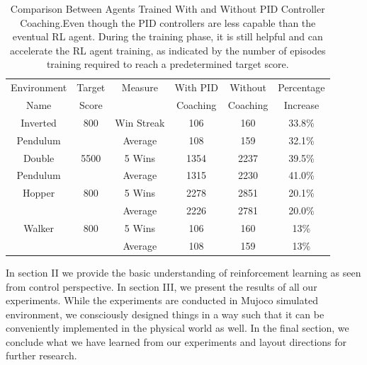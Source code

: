 \documentclass[journal]{IEEEtran}
\begin{document}
\begin{table}[H]
\scriptsize

\caption{Comparison Between Agents Trained With and Without PID Controller Coaching.Even though the PID controllers are less capable than the eventual RL agent. During the training phase, it is still helpful and can accelerate the RL agent training, as indicated by the number of episodes training required to reach a predetermined target score.}
\label{episode_compare}
\centering
\begin{tabular}{ cccccc }
\rowcolor{airforceblue}

Environment & Target & Measure  &  With PID  & Without  & Percentage\\
\rowcolor{airforceblue}

   Name     & Score  &              & Coaching  & Coaching  & Increase \\
\hline


Inverted & 800& Win Streak & 106 & 160&  33.8\% \\

Pendulum & &Average  & 108 &  159&  32.1\%\\
\rowcolor{beaublue}
Double & 5500& 5 Wins & 1354 & 2237&  39.5\%\\
\rowcolor{beaublue}
Pendulum & &Average & 1315 &  2230&  41.0\%\\
Hopper & 800& 5 Wins & 2278 & 2851&  20.1\%\\
       & &Average  & 2226 &  2781&  20.0\%\\
\rowcolor{beaublue}
Walker & 800& 5 Wins & 106 & 160&  13\%\\
\rowcolor{beaublue}
       & &Average  & 108 &  159&  13\%\\

\end{tabular}
\end{table}




In section II we provide the basic understanding of reinforcement learning as seen from control perspective. In section III, we present the results of all our experiments. While the experiments are conducted in Mujoco simulated environment, we consciously designed things in a way such that it can be conveniently implemented in the physical world as well. In the final section, we conclude what we have learned from our experiments and layout directions for further research.
\end{document}

